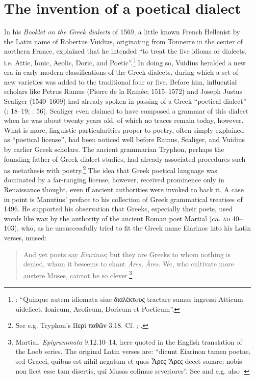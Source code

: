{\section{The invention of a poetical dialect}\label{sec:2.7}

In his \textit{Booklet on the Greek dialects} of 1569, a little known French Hellenist by the Latin name of Robertus Vuidius, originating from Tonnerre in the center of northern France, explained that he intended “to treat the five idioms or dialects, i.e. Attic, Ionic, Aeolic, Doric, and Poetic”.\footnote{\citet[137\textsc{\textsuperscript{v}}]{Vuidius1569}: “Quinque autem idiomata siue διαλέκτoυς tractare sumus ingressi Atticum uidelicet, Ionicum, Aeolicum, Doricum et Poeticum”.} In doing so, Vuidius heralded a new era in early modern classifications of the Greek dialects, during which a set of new varieties was added to the traditional four or five. Before him, influential scholars like Petrus Ramus (Pierre de la Ramée; 1515–1572) and Joseph Justus Scaliger (1540–1609) had already spoken in passing of a Greek “poetical dialect” (\citealt{Ramus1560}: 18–19; \citealt{Scaliger1594}: 56). Scaliger even claimed to have composed a grammar of this dialect when he was about twenty years old, of which no traces remain today, however. What is more, linguistic particularities proper to poetry, often simply explained as “poetical license”, had been noticed well before Ramus, Scaliger, and Vuidius by earlier Greek scholars. The ancient grammarian Tryphon, perhaps the founding father of Greek dialect studies, had already associated procedures such as metathesis with poetry.\footnote{See e.g. Tryphon’s Περὶ παθῶν 3.18. Cf. \citet[78\textsc{\textsuperscript{v}}]{Da1509}; \citet[209, 230, 235]{Vergara1537}.} The idea that Greek poetical language was dominated by a far-ranging license, however, received prominence only in Renaissance thought, even if ancient authorities were invoked to back it. A case in point is Manutius’ preface to his collection of Greek grammatical treatises of 1496. He supported his observation that Greeks, especially their poets, used words like wax by the authority of the ancient Roman poet Martial (ca. \textsc{ad} 40–103), who, as he unsuccessfully tried to fit the Greek name Eiarinos into his Latin verses, mused:

\begin{quote}
And yet poets say \textit{Eiarinos}; {\textbar} but they are Greeks to whom nothing is denied, {\textbar} whom it beseems to chant \textit{Āres}, \textit{Ăres}. {\textbar} We, who cultivate more austere Muses, {\textbar} cannot be so clever.\footnote{Martial, \textit{Epigrammata} 9.12.10–14, here quoted in the English translation of the Loeb series. The original Latin verses are: “dicunt Eiarinon tamen poetae, {\textbar} sed Graeci, quibus est nihil negatum {\textbar} et quos Ἆρες Ἄρες decet sonare: {\textbar} nobis non licet esse tam disertis, {\textbar} qui Musas colimus severiores”. See \citet[*.ii\textsc{\textsuperscript{v}}]{Manutius1496} and e.g. also \citet[187 \textsc{\textsuperscript{r}}]{Enoch1555}.}
\end{quote}

}
